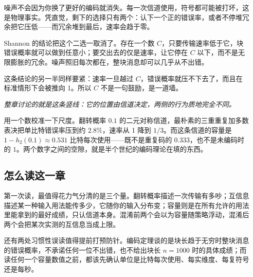 噪声不会因为你换了更好的编码就消失。每一次信道使用，符号都可能被打坏，这是物理事实。凭直觉，剩下的选择只有两个：认下一个正的错误率，或者不停堆冗余把它压低——而冗余堆到最后，速率会趋于零。

Shannon 的结论把这个二选一取消了。存在一个数 \(C\)，只要传输速率低于它，块错误概率就可以做到任意小；要交出去的仅是速率，让它停在 \(C\) 以下，而不是无限膨胀的冗余。噪声照旧每次都在，整块消息却可以几乎从不出错。

这条结论的另一半同样要紧：速率一旦越过 \(C\)，错误概率就压不下去了，而且在标准情形下会被推向 1。所以 \(C\) 不是一句鼓励，是一道墙。

\begin{center}

\emph{整章讨论的就是这条竖线：它的位置由信道决定，两侧的行为质地完全不同。}
\end{center}

用一个数校准一下尺度。翻转概率 \(0.1\) 的二元对称信道，最朴素的三重重复加多数表决把单比特错误率压到约 \(2.8\%\)，速率从 1 降到 \(1/3\)。而这条信道的容量是 \(1-h_2(0.1)\approx0.531\) 比特每次使用——既不是重复码的 \(0.333\)，也不是未编码时的 \(1\)。两个数字之间的空隙，就是半个世纪的编码理论在填的东西。

\subsection{怎么读这一章}

第一次读，最值得花力气分清的是三个量。翻转概率描述一次传输有多吵；互信息描述某一种输入用法能传多少，它随你的输入分布变；容量则是在所有允许的用法里能拿到的最好成绩，只认信道本身。混淆前两个会以为容量随策略浮动，混淆后两个会把某次实测的互信息当成上限。

还有两处习惯性误读值得提前打预防针。编码定理谈的是块长趋于无穷时整块消息的错误概率，不承诺任何一位不出错，也不给出块长 \(n=1000\) 时的具体成绩；而读任何一个容量数值之前，都该先确认单位是比特每次使用、每实维度、每复符号还是每秒。

